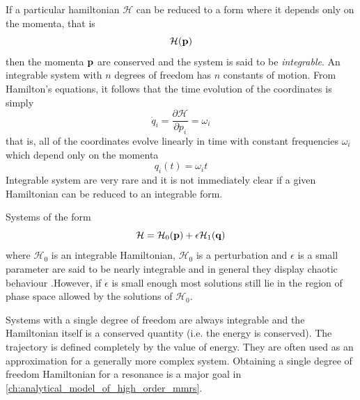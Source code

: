 If a particular hamiltonian $\mathcal{H}$ can be reduced to a form
where it depends only on the momenta, that is
\begin{equation}
    \mathcal{H}(\boldsymbol{\mathbf{p}})
\end{equation}
then the momenta $\boldsymbol{\mathbf{p}}$ are conserved and the system is said to be
\emph{integrable}. An integrable system with $n$ degrees of freedom
has $n$ constants of motion. From Hamilton's equations, it follows that the time
evolution of the coordinates is simply
\begin{equation}
    \dot{q}_i= \frac{\partial \mathcal{H}}{\partial p_i} =\omega_i
\end{equation}
that is, all of the coordinates evolve linearly in time with constant
frequencies $\omega_i$ which depend only on the momenta
\begin{equation}
q_i(t)=\omega_i t
\end{equation}
Integrable system are very rare and it is not immediately clear
if a given Hamiltonian can be reduced to an integrable form.

Systems of the form
\begin{equation}
    \mathcal{H}=\mathcal{H}_0(\boldsymbol{\mathbf{p}})+\epsilon \mathcal{H}_1(\boldsymbol{\mathbf{q}})
\end{equation}
where $\mathcal{H}_0$ is an integrable Hamiltonian, $\mathcal{H}_0$ is 
a perturbation and $\epsilon$ is a small parameter are said to be nearly 
integrable
and in general they display chaotic behaviour .However, if $\epsilon$ is 
small enough most solutions still lie in the region of phase space
allowed by the solutions of $\mathcal{H}_0$.

Systems with a single degree of freedom are always integrable and
the Hamiltonian itself is a conserved quantity (i.e. the energy
is conserved). The trajectory is defined completely by the value
of energy. They are often used as an approximation for a generally
more complex system. Obtaining a single degree of freedom
Hamiltonian for a resonance is a major goal in 
\cref{ch:analytical_model_of_high_order_mmrs}.


